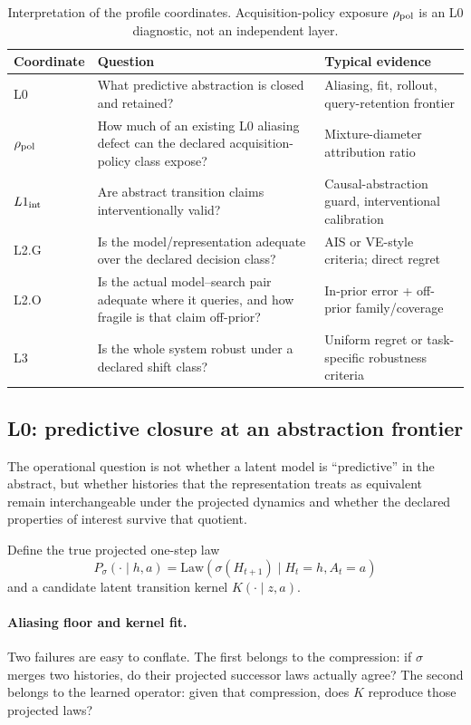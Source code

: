 \documentclass[10pt]{article}
\begin{document}
\begin{table}[t]
\centering
\caption{Interpretation of the profile coordinates. Acquisition-policy exposure $\rho_{\rm pol}$ is an L0 diagnostic, not an independent layer.}
\begin{tabularx}{\linewidth}{@{}lX X@{}}
\toprule
Coordinate & Question & Typical evidence \\
\midrule
L0 & What predictive abstraction is closed and retained? & Aliasing, fit, rollout, query-retention frontier \\
$\rho_{\rm pol}$ & How much of an existing L0 aliasing defect can the declared acquisition-policy class expose? & Mixture-diameter attribution ratio \\
$L1_{\rm int}$ & Are abstract transition claims interventionally valid? & Causal-abstraction guard, interventional calibration \\
L2.G & Is the model/representation adequate over the declared decision class? & AIS or VE-style criteria; direct regret \\
L2.O & Is the actual model--search pair adequate where it queries, and how fragile is that claim off-prior? & In-prior error + off-prior family/coverage \\
L3 & Is the whole system robust under a declared shift class? & Uniform regret or task-specific robustness criteria \\
\bottomrule
\end{tabularx}
\end{table}

\subsection{L0: predictive closure at an abstraction frontier}

The operational question is not whether a latent model is ``predictive'' in the abstract, but whether histories that the representation treats as equivalent remain interchangeable under the projected dynamics and whether the declared properties of interest survive that quotient.

Define the true projected one-step law
\[
P_\sigma(\cdot\mid h,a)
=
\mathrm{Law}\!\left(\sigma(H_{t+1})\mid H_t=h,A_t=a\right)
\]
and a candidate latent transition kernel $K(\cdot\mid z,a)$.

\paragraph{Aliasing floor and kernel fit.}
Two failures are easy to conflate. The first belongs to the compression: if $\sigma$ merges two histories, do their projected successor laws actually agree? The second belongs to the learned operator: given that compression, does $K$ reproduce those projected laws?
\end{document}
